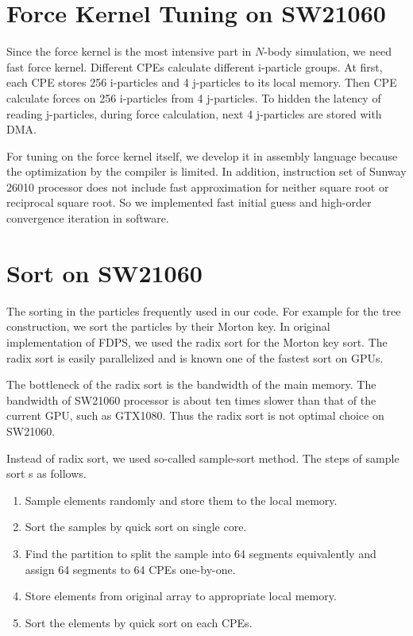 \documentclass[oribibl]{llncs}
\begin{document}
\appendix

\section{Force Kernel Tuning on SW21060}

Since the force kernel is the most intensive part in $N$-body
simulation, we need fast force kernel. Different CPEs calculate
different i-particle groups. At first, each CPE stores 256 i-particles
and 4 j-particles to its local memory. Then CPE calculate forces on
256 i-particles from 4 j-particles. To hidden the latency of reading
j-particles, during force calculation, next 4 j-particles are stored
with DMA.

For tuning on the force kernel itself, we develop it in assembly
language because the optimization by the compiler is limited. In
addition, instruction set of Sunway 26010 processor does not include
fast approximation for neither square root or reciprocal square
root. So we implemented fast initial guess and high-order convergence
iteration in software.

\section{Sort on SW21060}

The sorting in the particles frequently used in our code. For example
for the tree construction, we sort the particles by their Morton key.
In original implementation of FDPS, we used the radix sort for the
Morton key sort. The radix sort is easily parallelized and is known
one of the fastest sort on GPUs.

The bottleneck of the radix sort is the bandwidth of the main memory.
The bandwidth of SW21060 processor is about ten times slower than that
of the current GPU, such as GTX1080. Thus the radix sort is not
optimal choice on SW21060.

Instead of radix sort, we used so-called sample-sort method. The steps
of sample sort s as follows.

\begin{enumerate}
  
\item Sample elements randomly and store them to the local memory.

\item Sort the samples by quick sort on single core.

\item Find the partition to split the sample into 64 segments
  equivalently and assign 64 segments to 64 CPEs one-by-one.

\item Store elements from original array to appropriate local memory.

\item Sort the elements by quick sort on each CPEs.
  
\end{enumerate}
\end{document}

